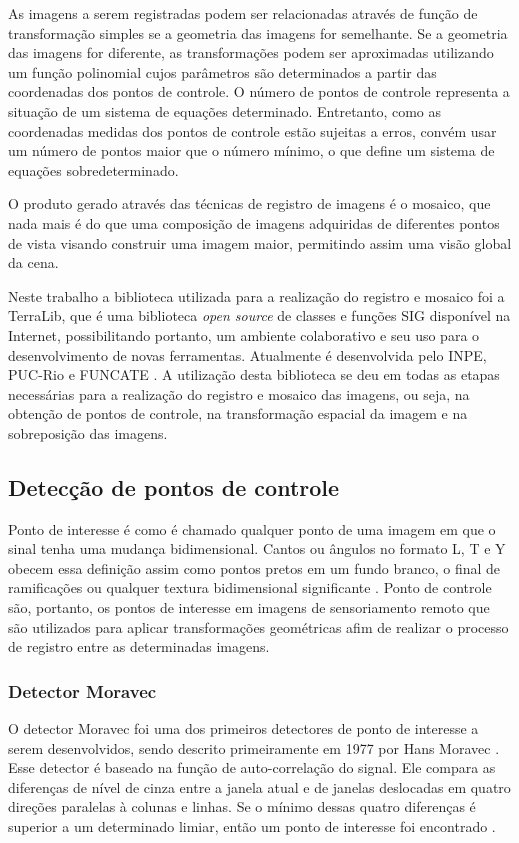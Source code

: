 \documentclass[9pt, a4paper, nofonttune, journal]{IEEEtran}
\begin{document}
As imagens a serem registradas podem ser relacionadas através de função de transformação simples se a geometria das imagens for semelhante.
Se a geometria das imagens for diferente, as transformações podem ser aproximadas utilizando um função polinomial cujos parâmetros são determinados 
a partir das coordenadas dos pontos de controle.
O número de pontos de controle representa a situação de um sistema de equações determinado.
Entretanto, como as coordenadas medidas dos pontos de controle estão sujeitas a erros, convém usar um número de pontos maior que o número mínimo,
o que define um sistema de equações sobredeterminado.

O produto gerado através das técnicas de registro de imagens é o mosaico, que nada mais é do que uma 
composição de imagens adquiridas de diferentes pontos de vista visando construir uma imagem maior, permitindo assim uma visão global da cena.\cite{Fedorov1}

Neste trabalho a biblioteca utilizada para a realização do registro e mosaico foi a TerraLib, que é uma biblioteca \textit{open source} de classes e funções SIG disponível na Internet, possibilitando portanto, um ambiente colaborativo e seu uso para o desenvolvimento de novas ferramentas. Atualmente é desenvolvida pelo INPE, PUC-Rio e FUNCATE \cite{Terralib1}. A utilização desta biblioteca se deu em todas as etapas necessárias para a realização do registro e mosaico das imagens, ou seja, na obtenção de pontos de controle, na transformação espacial da imagem e na sobreposição das imagens.

\subsection{Detecção de pontos de controle}
Ponto de interesse é como é chamado qualquer ponto de uma imagem em que o sinal tenha uma mudança bidimensional. Cantos ou ângulos no formato L, T e Y obecem essa definição assim como pontos pretos em um fundo branco, o final de ramificações ou qualquer textura bidimensional significante \cite{Coderlia1}. Ponto de controle são, portanto, os pontos de interesse em imagens de sensoriamento remoto que são utilizados para aplicar transformações geométricas afim de realizar o processo de registro entre as determinadas imagens.\cite{Schowengerdt}

\subsubsection{Detector Moravec}
O detector Moravec foi uma dos primeiros detectores de ponto de interesse a serem desenvolvidos, sendo descrito primeiramente 
em 1977 por Hans Moravec \cite{Moravec1}. Esse detector é baseado na função de auto-correlação do signal. Ele compara as diferenças de nível de cinza entre a janela atual e de janelas 
deslocadas em quatro direções paralelas à colunas e linhas. Se o mínimo dessas quatro diferenças é superior a um determinado limiar, então um ponto de interesse
foi encontrado \cite{Coderlia1}.
  
\end{document}
